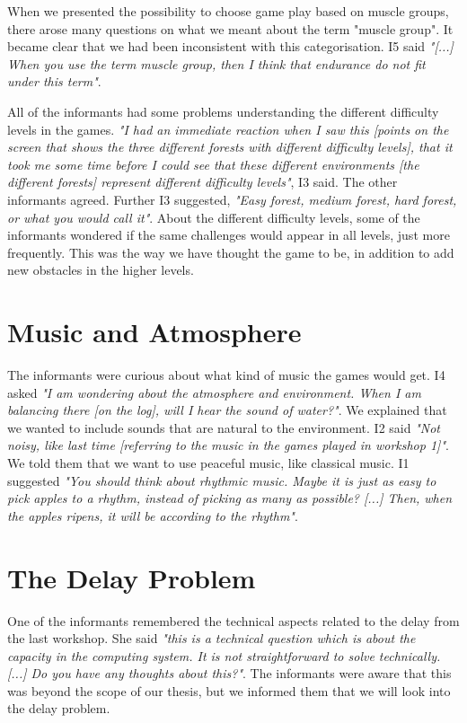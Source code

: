 When we presented the possibility to choose game play based on muscle groups, there arose many questions on what we meant about the term "muscle group". It became clear that we had been inconsistent with this categorisation. I5 said \emph{"[...] When you use the term muscle group, then I think that endurance do not fit under this term"}.   

All of the informants had some problems understanding the different difficulty levels in the games. \emph{"I had an immediate reaction when I saw this [points on the screen that shows the three different forests with different difficulty levels], that it took me some time before I could see that these different environments [the different forests] represent different difficulty levels"}, I3 said. The other informants agreed. Further I3 suggested, \emph{"Easy forest, medium forest, hard forest, or what you would call it"}. About the different difficulty levels, some of the informants wondered if the same challenges would appear in all levels, just more frequently. This was the way we have thought the game to be, in addition to add new obstacles in the higher levels.

\section{Music and Atmosphere}

The informants were curious about what kind of music the games would get. I4 asked \emph{"I am wondering about the atmosphere and environment. When I am balancing there [on the log], will I hear the sound of water?"}. We explained that we wanted to include sounds that are natural to the environment. I2 said \emph{"Not noisy, like last time [referring to the music in the games played in workshop 1]"}. We told them that we want to use peaceful music, like classical music. I1 suggested \emph{"You should think about rhythmic music. Maybe it is just as easy to pick apples to a rhythm, instead of picking as many as possible? [...] Then, when the apples ripens, it will be according to the rhythm"}. 

\section{The Delay Problem}


One of the informants remembered the technical aspects related to the delay from the last workshop. She said  \emph{"this is a technical question which is about the capacity in the computing system. It is not straightforward to solve technically. [...] Do you have any thoughts about this?"}. The informants were aware that this was beyond the scope of our thesis, but we informed them that we will look into the delay problem.

